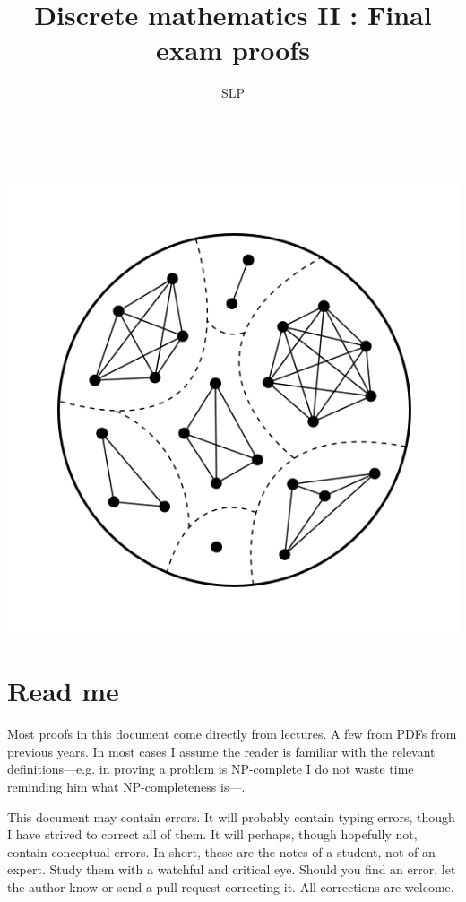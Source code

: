 \documentclass[a4paper, 12pt]{article}
\author{SLP}
\title{Discrete mathematics II : Final exam proofs}
\begin{document}
\maketitle
~ 
~
\begin{center}
\includegraphics[scale=0.35]{equiv}
\end{center}

\clearpage
\tableofcontents
\clearpage 

\section{Read me}

Most proofs in this document come directly from lectures. A few from PDFs from
previous years. In most cases I assume the reader is familiar with the relevant
definitions---e.g. in proving a problem is NP-complete I do not waste time
reminding him what NP-completeness is---.

This document may contain errors. It will probably contain typing errors,
though I have strived to correct all of them. It will perhaps, though hopefully
not, contain conceptual errors. In short, these are the notes of a student, not
of an expert. Study them with a watchful and critical eye. Should you find an
error, let the author know or send a pull request correcting it. All corrections
are welcome.
\end{document}
